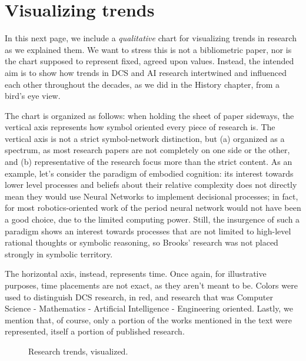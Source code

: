 \documentclass[../main.tex]{subfiles}
\begin{document}
\section{Visualizing trends}
In this next page, we include a \textit{qualitative} chart for visualizing trends in research as we explained them. We want to stress this is not a bibliometric paper, nor is the chart supposed to represent fixed, agreed upon values. Instead, the intended aim is to show how trends in DCS and AI research intertwined and influenced each other throughout the decades, as we did in the History chapter, from a bird's eye view.

The chart is organized as follows: when holding the sheet of paper sideways, the vertical axis represents how symbol oriented every piece of research is. The vertical axis is not a strict symbol-network distinction, but (a) organized as a spectrum, as most research papers are not completely on one side or the other, and (b) representative of the research focus more than the strict content. As an example, let's consider the paradigm of embodied cognition: its interest towards lower level processes and beliefs about their relative complexity does not directly mean they would use Neural Networks to implement decisional processes; in fact, for most robotics-oriented work of the period neural network would not have been a good choice, due to the limited computing power. Still, the insurgence of such a paradigm shows an interest towards processes that are not limited to high-level rational thoughts or symbolic reasoning, so Brooks' research was not placed strongly in symbolic territory.

The horizontal axis, instead, represents time. Once again, for illustrative purposes, time placements are not exact, as they aren't meant to be. Colors were used to distinguish DCS research, in red, and research that was Computer Science - Mathematics - Artificial Intelligence - Engineering oriented. Lastly, we mention that, of course, only a portion of the works mentioned in the text were represented, itself a portion of published research.

\newpage

\begin{figure}[p]
    \caption{Research trends, visualized.}
\end{figure}
\end{document}
